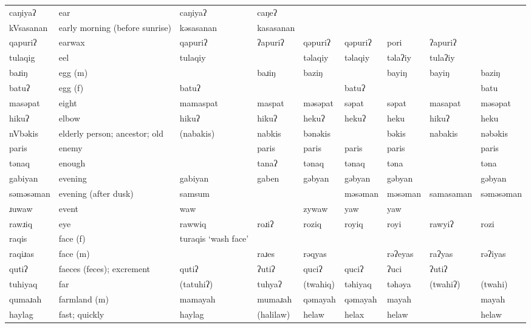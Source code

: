 \begin{landscape}
\begin{longtable}{*{9}{>{\raggedright\arraybackslash}p{}}}
\text{*}caŋiyaʔ      & ear & caŋiyaʔ & caŋeʔ &  &  &  &  & \\
\text{*}kVsasanan    & early morning (before sunrise) & kəsasanan & kasasanan &  &  &  &  & \\
\text{*}qapuriʔ      & earwax & qapuriʔ & ʔapuriʔ & qəpuriʔ & qəpuriʔ & pori & ʔapuriʔ & \\
\text{*}tulaqig      & eel & tulaqiy &  & təlaqiy & təlaqiy & təlaʔiy & tulaʔiy & \\
\text{*}baɹiŋ        & egg (m) &  & baɹiŋ & baziŋ &  & bayiŋ & bayiŋ & baziŋ\\
\text{*}batuʔ        & egg (f) & batuʔ &  &  & batuʔ &  &  & batu\\
\text{*}masəpat      & eight & mamaspat & maspat & məsəpat & səpat & səpat & masapat & məsəpat\\
\text{*}hikuʔ        & elbow & hikuʔ & hikuʔ & hekuʔ & hekuʔ & heku & hikuʔ & heku\\
\text{*}nVbəkis      & elderly person; ancestor; old & (nabakis) & nabkis & bənəkis &  & bəkis & nabakis & nəbəkis\\
\text{*}paris        & enemy &  & paris & paris & paris & paris &  & paris\\
\text{*}tənaq        & enough &  & tanaʔ & tənaq & tənaq & təna &  & təna\\
\text{*}gabiyan      & evening & gabiyan & gaben & gəbyan & gəbyan & gəbyan &  & gəbyan\\
\text{*}səməsəman    & evening (after dusk) & samsum &  &  & məsəman & məsəman & samasaman & səməsəman\\
\text{*}ɹuwaw        & event & waw &  & zywaw & yaw & yaw &  & \\
\text{*}rawɹiq       & eye & rawwiq & roɹiʔ & roziq & royiq & royi & rawyiʔ & rozi\\
\text{*}raqis        & face (f) & turaqis \newline `wash face' &  &  &  &  &  & \\
\text{*}raqiɹas      & face (m) &  & raɹes & rəqyas &  & rəʔeyas & raʔyas & rəʔiyas\\
\text{*}qutiʔ        & faeces (feces); excrement & qutiʔ & ʔutiʔ & quciʔ & quciʔ & ʔuci & ʔutiʔ & \\
\text{*}tuhiyaq      & far & (tatuhiʔ) & tuhyaʔ & (twahiq) & təhiyaq & təhəya & (twahiʔ) & (twahi)\\
\text{*}qumaɹah      & farmland (m) & mamayah & mumaɹah & qəmayah & qəmayah & mayah &  & mayah\\
\text{*}haylag       & fast; quickly & haylag & (halilaw) & helaw & helax & helaw &  & helaw\\

\end{longtable}
\end{landscape}

